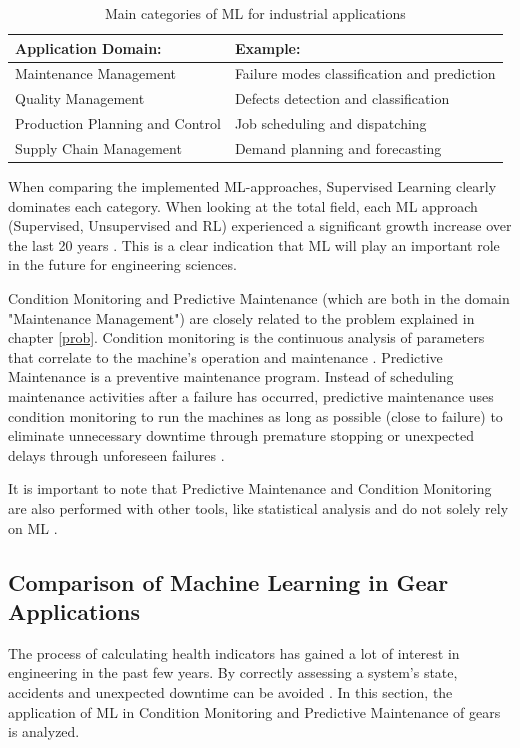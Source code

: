 \begin{table}
	\begin{center}
		\begin{tabular}{|| l | l ||}
			\hline
			\rule{0pt}{2ex}Application Domain: & Example:\\
			\hline
			\hline
			\rule{0pt}{2ex}Maintenance Management & Failure modes classification and prediction\\\hline
			Quality Management & Defects detection and classification\\	\hline
			Production Planning and Control & Job scheduling and dispatching\\\hline
			Supply Chain Management & Demand planning and forecasting\\
			\hline
		\end{tabular}
		\caption{Main categories of ML for industrial applications \cite{Bertolini}}
		\label{MLIND}
	\end{center}
	\vspace{-4mm}
\end{table}
When comparing the implemented ML-approaches, Supervised Learning clearly dominates each category. When looking at the total field, each ML approach (Supervised, Unsupervised and RL) experienced a significant growth increase over the last 20 years \cite{Bertolini}. This is a clear indication that ML will play an important role in the future for engineering sciences.

Condition Monitoring and Predictive Maintenance (which are both in the domain "Maintenance Management") are closely related to the problem explained in chapter \ref{prob}.
Condition monitoring is the continuous analysis of parameters that correlate to the machine's operation and maintenance \cite{Rao}. Predictive Maintenance is a preventive maintenance program. Instead of scheduling maintenance activities after a failure has occurred, predictive maintenance uses condition monitoring to run the machines as long as possible (close to failure) to eliminate unnecessary downtime through premature stopping or unexpected delays through unforeseen failures \cite{Mobley}.

It is important to note that Predictive Maintenance and Condition Monitoring are also performed with other tools, like statistical analysis and do not solely rely on ML \cite{Carvalho, Divya}. 


 
\subsection{Comparison of Machine Learning in Gear Applications}
The process of calculating health indicators has gained a lot of interest in engineering in the past few years. By correctly assessing a system's state, accidents and unexpected downtime can be avoided \cite{Wang}. In this section, the application of ML in Condition Monitoring and Predictive Maintenance of gears is analyzed.

